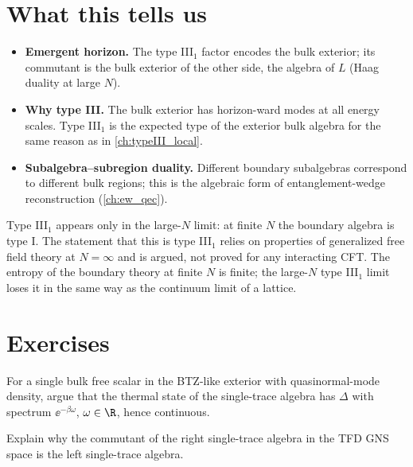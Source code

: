 \section{What this tells us}
\begin{itemize}
\item \textbf{Emergent horizon.} The type III$_1$ factor encodes the bulk exterior; its commutant is the bulk exterior of the other side, the algebra of $L$ (Haag duality at large $N$).
\item \textbf{Why type III.} The bulk exterior has horizon-ward modes at all energy scales. Type III$_1$ is the expected type of the exterior bulk algebra for the same reason as in \cref{ch:typeIII_local}.
\item \textbf{Subalgebra--subregion duality.} Different boundary subalgebras correspond to different bulk regions; this is the algebraic form of entanglement-wedge reconstruction (\cref{ch:ew_qec}).
\end{itemize}

\begin{whatwrong}
Type III$_1$ appears only in the large-$N$ limit: at finite $N$ the boundary algebra is type I. The statement that this is type III$_1$ relies on properties of generalized free field theory at $N=\infty$ and is argued, not proved for any interacting CFT. The entropy of the boundary theory at finite $N$ is finite; the large-$N$ type III$_1$ limit loses it in the same way as the continuum limit of a lattice.
\end{whatwrong}

\section*{Exercises}
\begin{exercise}
For a single bulk free scalar in the BTZ-like exterior with quasinormal-mode density, argue that the thermal state of the single-trace algebra has $\Delta$ with spectrum $\ee^{-\beta\omega}$, $\omega\in\R$, hence continuous.
\end{exercise}
\begin{exercise}
Explain why the commutant of the right single-trace algebra in the TFD GNS space is the left single-trace algebra.
\end{exercise}
